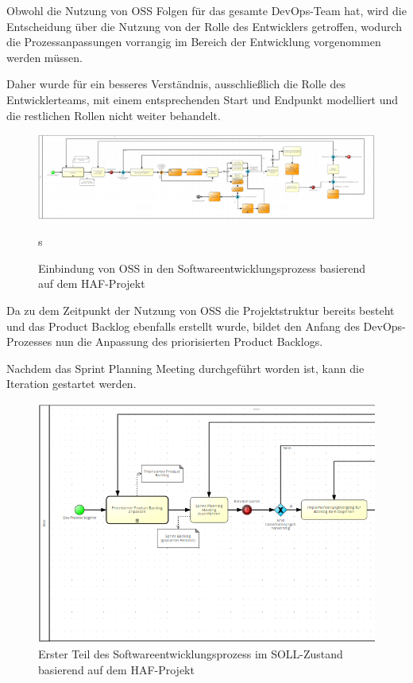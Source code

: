 Obwohl die Nutzung von OSS Folgen für das gesamte DevOps-Team hat, wird die Entscheidung über die Nutzung von der Rolle des Entwicklers getroffen, wodurch die Prozessanpassungen vorrangig im Bereich der Entwicklung vorgenommen werden müssen. 

Daher wurde für ein besseres Verständnis, ausschließlich die Rolle des Entwicklerteams, mit einem entsprechenden Start und Endpunkt modelliert und die restlichen Rollen nicht weiter behandelt.

\begin{figure}[p]
    \centering
    \includegraphics[angle=90, scale=0.5]{Bilder/SOLL-Prozess.png}
    \caption{Einbindung von OSS in den Softwareentwicklungsprozess basierend auf dem HAF-Projekt}s
\end{figure}

Da zu dem Zeitpunkt der Nutzung von OSS die Projektstruktur bereits besteht und das Product Backlog ebenfalls erstellt wurde, bildet den Anfang des DevOps-Prozesses nun die Anpassung des priorisierten Product Backlogs.

Nachdem das Sprint Planning Meeting durchgeführt worden ist, kann die Iteration gestartet werden. 

\begin{figure}[h]
    \centering
    \includegraphics[scale=0.8]{Bilder/SOLL-Prozess_first Part.png}
    \caption{Erster Teil des Softwareentwicklungsprozess im SOLL-Zustand basierend auf dem HAF-Projekt}
\end{figure}

